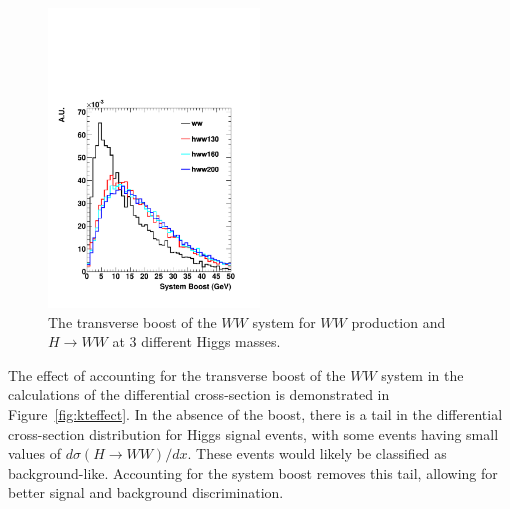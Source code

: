 \begin{figure}[!htbp]                                                                                         
\begin{center}                                                                                                
\includegraphics[width=0.5\textwidth]{figures/boost.pdf}                                                      
\caption{The transverse boost of the $WW$ system for $WW$ production and $H \rightarrow WW$ at 3 different Higgs masses.} 
\label{fig:wwboost}                                                                                           
\end{center}                                                                                                  
\end{figure}    

The effect of accounting for the transverse boost of the $WW$ system in the calculations of the differential cross-section
is demonstrated in Figure~\ref{fig:kteffect}. In the absence of the boost, there is a tail in the differential cross-section distribution
for Higgs signal events, with some events having small values of $d\sigma(H \rightarrow WW)/dx$.  
These events would likely be classified as background-like. Accounting for the system boost removes this tail,
allowing for better signal and background discrimination. 

